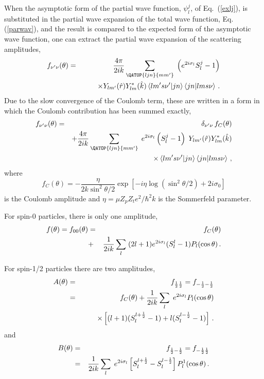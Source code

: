 When the asymptotic form of the partial wave function, $\psi_{l}^{j}$, of
Eq.~(\ref{exlj}), is substituted in the partial wave expansion of the total
wave function, Eq. (\ref{parwav}), and the result is compared to the
expected form of the asymptotic wave function, one can extract the partial
wave expansion of the scattering amplitudes,
\begin{eqnarray}
f_{\nu^{\prime}\nu}(\theta) & = & \frac{4\pi}{2ik}\sum_{{{\QATOP{ljn}{%
mm^{\prime}}}}}\;\left(e^{2i\sigma_{l}}S_{l}^{j}-1\right) \\
& & \qquad\times Y_{lm^{\prime}}(\hat{r})Y_{lm}^{*}(\hat{k})\left\langle
lm^{\prime}s\nu^{\prime}|jn\right\rangle \left\langle jn|lms\nu\right\rangle
\,.  \notag
\end{eqnarray}
Due to the slow convergence of the Coulomb term, these are written in a form
in which the Coulomb contribution has been summed exactly,%
\begin{eqnarray}
f_{\nu^{\prime}\nu}(\theta) & = & \delta_{\nu^{\prime}\nu}\, f_{C}(\theta) \\
& & +\frac{4\pi}{2ik}\sum_{{{\QATOP{ljn}{mm^{\prime}}}}}\;
e^{2i\sigma_{l}}\left(S_{l}^{j}-1\right)\; Y_{lm^{\prime}}(\hat{r}%
)Y_{lm}^{*}(\hat{k})  \notag \\
& & \qquad\qquad\times\left\langle lm^{\prime}s\nu^{\prime}|jn\right\rangle
\left\langle jn|lms\nu\right\rangle \,,  \notag
\end{eqnarray}
where
\begin{equation}
f_{C}(\theta)=-\frac{\eta}{2k\sin^{2}\theta/2}\exp\left[-i\eta\log\left(%
\sin^{2}\theta/2\right)+2i\sigma_{0}\right]
\end{equation}
is the Coulomb amplitude and $\eta=\mu Z_p Z_t e^2/\hbar^2 k $ is the
Sommerfeld parameter.

For spin-0 particles, there is only one amplitude,
\begin{eqnarray}
f(\theta)=f_{00}(\theta) & = & f_{C}(\theta) \\
& + & \frac{1}{2ik}\sum_{l}\;(2l+1)e^{2i\sigma_{l}}(S_{l}^{l}-1)P_{l}(\cos%
\theta)\,.  \notag
\end{eqnarray}

For spin-1/2 particles there are two amplitudes,
\begin{eqnarray}
A(\theta) & = & f_{\frac{1}{2}\frac{1}{2}}=f_{-\frac{1}{2}-\frac{1}{2}} \\
& = & f_{C}(\theta)+\frac{1}{2ik}\sum_{l}\; e^{2i\sigma_{l}}P_{l}(\cos\theta)
\notag \\
& & \qquad\times\left[(l+1)(S_{l}^{l+\frac{1}{2}}-1)+l(S_{l}^{l-\frac{1}{2}%
}-1)\right]\,.  \notag
\end{eqnarray}
and
\begin{eqnarray}
B(\theta) & = & f_{\frac{1}{2}-\frac{1}{2}}=f_{-\frac{1}{2}\frac{1}{2}} \\
& = & \frac{1}{2ik}\sum_{l}\; e^{2i\sigma_{l}}\left[S_{l}^{l+\frac{1}{2}%
}-S_{l}^{l-\frac{1}{2}}\right]P_{l}^{1}(\cos\theta)\,.  \notag
\end{eqnarray}

